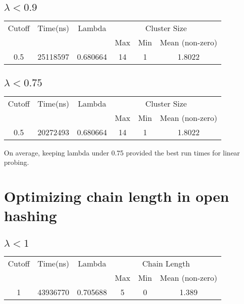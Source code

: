 \documentclass[12pt]{article}
\begin{document}
\subsection{$\lambda < 0.9$}
\begin{center}
\begin{tabular}{|c|c|c|c|c|c|}
\hline
Cutoff & Time(ns) & Lambda & \multicolumn{3}{|c|}{Cluster Size} \\
 & & & Max & Min & Mean (non-zero) \\
\hline
0.5 & 25118597 & 0.680664 & 14 & 1 & 1.8022 \\
\hline
\end{tabular}
\end{center}

\subsection{$\lambda < 0.75$}
\begin{center}
\begin{tabular}{|c|c|c|c|c|c|}
\hline
Cutoff & Time(ns) & Lambda & \multicolumn{3}{|c|}{Cluster Size} \\
 & & & Max & Min & Mean (non-zero) \\
\hline
0.5 & 20272493 & 0.680664 & 14 & 1 & 1.8022 \\
\hline
\end{tabular}
\end{center}
On average, keeping lambda under 0.75 provided the best run times for linear probing.

\section {Optimizing chain length in open hashing}

\subsection{$\lambda < 1$}
\begin{center}
\begin{tabular}{|c|c|c|c|c|c|}
\hline
Cutoff & Time(ns) & Lambda & \multicolumn{3}{|c|}{Chain Length} \\
 & & & Max & Min & Mean (non-zero) \\
\hline
1 & 43936770 & 0.705688 & 5 & 0 & 1.389 \\
\hline
\end{tabular}
\end{center}
\end{document}
